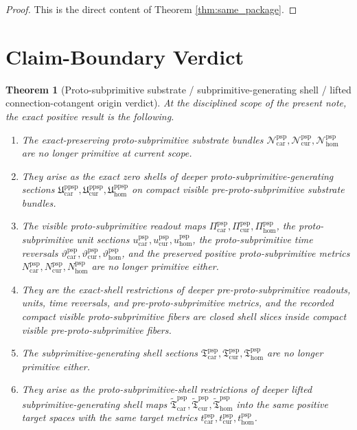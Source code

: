 \documentclass[11pt]{article}
\newcommand{\Car}{\mathrm{car}}
\newcommand{\Cur}{\mathrm{cur}}
\newcommand{\Hom}{\mathrm{hom}}
\newcommand{\ProtoSubprimTargetMetric}[1]{t_{#1}^{\mathrm{psp}}}
\newcommand{\ProtoSubprimSpace}[1]{\mathcal N_{#1}^{\mathrm{psp}}}
\newcommand{\ProtoSubprimRead}[1]{\Pi_{#1}^{\mathrm{psp}}}
\newcommand{\ProtoSubprimUnit}[1]{u_{#1}^{\mathrm{psp}}}
\newcommand{\ProtoSubprimTimeRev}[1]{\vartheta_{#1}^{\mathrm{psp}}}
\newcommand{\ProtoSubprimMetric}[1]{N_{#1}^{\mathrm{psp}}}
\newcommand{\ProtoSubprimSection}[1]{\mathfrak T_{#1}^{\mathrm{psp}}}
\newcommand{\PreProtoSubprimSection}[1]{\mathfrak U_{#1}^{\mathrm{ppsp}}}
\newcommand{\PreProtoSubprimLiftedSubprimitive}[1]{\widetilde{\mathfrak T}_{#1}^{\mathrm{psp}}}
\newtheorem{theorem}{Theorem}
\begin{document}
\begin{proof}
This is the direct content of Theorem \ref{thm:same_package}.
\end{proof}

\section{Claim-Boundary Verdict}

\begin{theorem}[Proto-subprimitive substrate / subprimitive-generating shell / lifted connection-cotangent origin verdict]
\label{thm:verdict}
At the disciplined scope of the present note, the exact positive result is the following.
\begin{enumerate}
    \item The exact-preserving proto-subprimitive substrate bundles \(\ProtoSubprimSpace{\Car},\ProtoSubprimSpace{\Cur},\ProtoSubprimSpace{\Hom}\) are no longer primitive at current scope.
    \item They arise as the exact zero shells of deeper proto-subprimitive-generating sections \(\PreProtoSubprimSection{\Car},\PreProtoSubprimSection{\Cur},\PreProtoSubprimSection{\Hom}\) on compact visible pre-proto-subprimitive substrate bundles.
    \item The visible proto-subprimitive readout maps \(\ProtoSubprimRead{\Car},\ProtoSubprimRead{\Cur},\ProtoSubprimRead{\Hom}\), the proto-subprimitive unit sections \(\ProtoSubprimUnit{\Car},\ProtoSubprimUnit{\Cur},\ProtoSubprimUnit{\Hom}\), the proto-subprimitive time reversals \(\ProtoSubprimTimeRev{\Car},\ProtoSubprimTimeRev{\Cur},\ProtoSubprimTimeRev{\Hom}\), and the preserved positive proto-subprimitive metrics \(\ProtoSubprimMetric{\Car},\ProtoSubprimMetric{\Cur},\ProtoSubprimMetric{\Hom}\) are no longer primitive either.
    \item They are the exact-shell restrictions of deeper pre-proto-subprimitive readouts, units, time reversals, and pre-proto-subprimitive metrics, and the recorded compact visible proto-subprimitive fibers are closed shell slices inside compact visible pre-proto-subprimitive fibers.
    \item The subprimitive-generating shell sections \(\ProtoSubprimSection{\Car},\ProtoSubprimSection{\Cur},\ProtoSubprimSection{\Hom}\) are no longer primitive either.
    \item They arise as the proto-subprimitive-shell restrictions of deeper lifted subprimitive-generating shell maps \(\PreProtoSubprimLiftedSubprimitive{\Car},\PreProtoSubprimLiftedSubprimitive{\Cur},\PreProtoSubprimLiftedSubprimitive{\Hom}\) into the same positive target spaces with the same target metrics \(\ProtoSubprimTargetMetric{\Car},\ProtoSubprimTargetMetric{\Cur},\ProtoSubprimTargetMetric{\Hom}\).

\end{enumerate}
\end{theorem}
\end{document}
